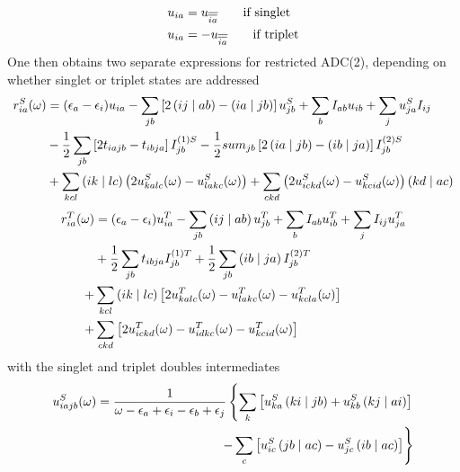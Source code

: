 \begin{equation}
\begin{split}
u_{ia} &= u_{\overline{\overline{ia}}} \qquad \textrm{if singlet} \\
u_{ia} &= - u_{\overline{\overline{ia}}} \qquad \textrm{if triplet} 
\end{split}
\end{equation}
\noindent One then obtains two separate expressions for restricted ADC(2), depending on whether singlet or triplet states are addressed
\begin{equation}
\begin{split}
r_{ia}^S(\omega) &= (\epsilon_a - \epsilon_i) u_{ia} - \sum_{jb} \left[ 2\left( ij \mid ab \right) - \left( ia \mid jb \right) \right] u_{jb}^S + \sum_b I_{ab} u_{ib} + \sum_j u_{ja}^S I_{ij} \\
&- \frac{1}{2} \sum_{jb} \left[2t_{iajb} - t_{ibja}\right] I^{(1)S}_{jb} - \frac{1}{2} sum_{jb} \left[ 2 \left( ia \mid jb \right) - \left( ib \mid ja \right) \right] I^{(2)S}_{jb} \\
&+ \sum_{kcl} \left( ik \mid lc \right) \left( 2 u_{kalc}^S(\omega) - u_{lakc}^S(\omega) \right) + \sum_{ckd} \left( 2 u^S_{ickd}(\omega) - u^S_{kcid}(\omega) \right) \left( kd \mid ac \right)  
\end{split}
\end{equation} 
\begin{equation}
\begin{split}
r_{ia}^T(\omega) &= (\epsilon_a - \epsilon_i) u_{ia}^T - \sum_{jb} \left( ij \mid ab \right) u_{jb}^T + \sum_b I_{ab} u_{ib}^T + \sum_j I_{ij} u_{ja}^T \\
&+ \frac{1}{2} \sum_{jb} t_{ibja} I^{(1)T}_{jb} + \frac{1}{2} \sum_{jb} \left( ib \mid ja \right) I^{(2)T}_{jb} \\
+& \sum_{kcl} \left( ik \mid lc \right) \left[ 2 u^T_{kalc}(\omega) - u^T_{lakc}(\omega) - u^T_{kcla}(\omega) \right] \\
+& \sum_{ckd} \left[ 2 u^T_{ickd}(\omega) - u^T_{idkc}(\omega) - u^T_{kcid}(\omega) \right] 
\end{split}
\end{equation}
\noindent with the singlet and triplet doubles intermediates
\begin{equation}
\begin{split}
u^S_{iajb}(\omega) = \frac{1}{\omega - \epsilon_a + \epsilon_i - \epsilon_b + \epsilon_j} \left\lbrace \sum_k \left[ u^S_{ka} \left( ki \mid jb \right) + u^S_{kb} \left( kj \mid ai \right) \right] \right. \\
\left. - \sum_c \left[ u^S_{ic} \left( jb \mid ac \right) - u^S_{jc} \left( ib \mid ac \right) \right] \right\rbrace
\end{split} 
\end{equation}
